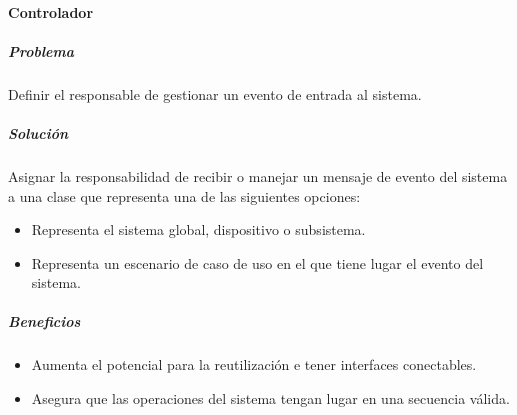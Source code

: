 \paragraph{Controlador}
\subparagraph{Problema}
Definir el responsable de gestionar un evento de entrada al sistema.
\subparagraph{Solución}
Asignar la responsabilidad de recibir o manejar un mensaje de evento del sistema a una clase que representa una de las siguientes opciones:
\begin{itemize}
\item Representa el sistema global, dispositivo o subsistema.
\item Representa un escenario de caso de uso en el que tiene lugar el evento del sistema.
\end{itemize}
\subparagraph{Beneficios}
\begin{itemize}
\item Aumenta el potencial para la reutilización e tener interfaces conectables.
\item Asegura que las operaciones del sistema tengan lugar en una secuencia válida.
\end{itemize}
